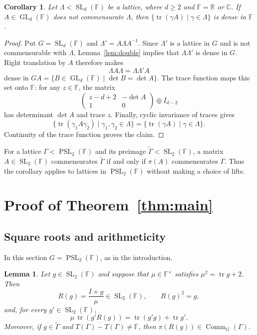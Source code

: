 \documentclass[reqno]{amsart}
\newtheorem{lemma}[theorem]{Lemma}
\newtheorem{corollary}[theorem]{Corollary}
\theoremstyle{remark}
\DeclareMathOperator{\tr}{tr}
\DeclareMathOperator{\Comm}{Comm}
\DeclareMathOperator{\GL}{GL}
\DeclareMathOperator{\SL}{SL}
\DeclareMathOperator{\PSL}{PSL}
\newcommand{\R}{\mathbb R}
\newcommand{\C}{\mathbb C}
\newcommand{\F}{\mathbb F}
\newcommand{\G}{\widetilde\Gamma}
\begin{document}
\begin{corollary}\label{cor:twisted}
Let $\Lambda<\SL_d(\F)$ be a lattice, where $d\ge2$ and $\F=\R$ or $\C$. If $A\in\GL_d(\F)$ does not commensurate $\Lambda$, then $\{\tr(\gamma A)\mid \gamma\in\Lambda\}$ is dense in $\F$.
\end{corollary}

\begin{proof}
Put $G=\SL_d(\F)$ and $\Lambda'=A\Lambda A^{-1}$. Since $\Lambda'$ is a lattice in $G$ and is not commensurable with $\Lambda$, Lemma~\ref{lem:double} implies that $\Lambda\Lambda'$ is dense in $G$. Right translation by $A$ therefore makes
$$
\Lambda A\Lambda=\Lambda\Lambda'A
$$
dense in $GA=\{B\in\GL_d(\F)\mid \det B=\det A\}$. The trace function maps this set onto $\F$: for any $z\in\F$, the matrix
$$
\begin{pmatrix}z-d+2&-\det A\\1&0\end{pmatrix}\oplus I_{d-2}
$$
has determinant $\det A$ and trace $z$. Finally, cyclic invariance of traces gives
$$
\{\tr(\gamma_1A\gamma_2)\mid \gamma_1,\gamma_2\in\Lambda\}
=\{\tr(\gamma A)\mid \gamma\in\Lambda\}.
$$
Continuity of the trace function proves the claim.
\end{proof}

For a lattice $\Gamma<\PSL_2(\F)$ and its preimage $\G < \SL_2(\F)$, a matrix $A\in\SL_2(\F)$ commensurates $\G$ if and only if $\pi(A)$ commensurates $\Gamma$. Thus the corollary applies to lattices in $\PSL_2(\F)$ without making a choice of lifts.

\section{Proof of Theorem~\ref{thm:main}}\label{sec:roots}

\subsection{Square roots and arithmeticity}

In this section $G=\PSL_2(\F)$, as in the introduction.

\begin{lemma}\label{lem:root}
Let $g\in\SL_2(\F)$ and suppose that $\mu \in\F^\times$ satisfies $\mu^2=\tr g+2$. Then
$$
R(g)=\frac{I+g}{\mu}\in\SL_2(\F), \qquad R(g)^2=g,
$$
and, for every $g'\in\SL_2(\F)$,
\begin{equation}\label{eq:roottrace}
\mu\,\tr(g' R(g))=\tr(g' g)+\tr g'.
\end{equation}
Moreover, if $g\in\G$ and $\overline{T(\Gamma)-T(\Gamma)}\ne\F$, then $\pi(R(g))\in\Comm_G(\Gamma)$.
\end{lemma}
\end{document}
